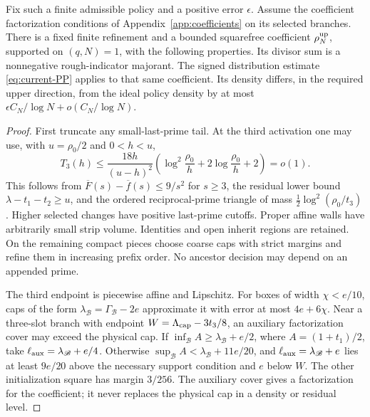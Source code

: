 \begin{proposition}\label{sv:finite-realization}
Fix such a finite admissible policy and a positive error $\epsilon$.
Assume the coefficient factorization conditions of
Appendix~\ref{app:coefficients} on its selected branches.
There is a fixed finite refinement and a bounded squarefree
coefficient $\rho_N^{\rm up}$, supported on $(q,N)=1$, with the following
properties.  Its divisor sum is a nonnegative rough-indicator
majorant.  The signed distribution estimate \eqref{eq:current-PP}
applies to that same coefficient.  Its density differs, in the
required upper direction, from the ideal policy density by at most
$\epsilon C_N/\log N+o(C_N/\log N)$.
\end{proposition}

\begin{proof}
First truncate any small-last-prime tail.  At the third activation
one may use, with $u=\rho_0/2$ and $0<h<u$,
\begin{equation}\label{sv:activation-tail}
 T_3(h)\le\frac{18h}{(u-h)^2}
   \left(\log^2\frac{\rho_0}{h}
                   +2\log\frac{\rho_0}{h}+2\right)=o(1).
\end{equation}
This follows from $\overline F(s)-\overline f(s)\le9/s^2$
for $s\ge3$, the residual lower bound $\lambda-t_1-t_2\ge u$,
and the ordered reciprocal-prime triangle of mass
$\tfrac12\log^2(\rho_0/t_3)$.  Higher selected changes have
positive last-prime cutoffs.  Proper affine walls have arbitrarily
small strip volume.  Identities and open inherit regions are
retained.  On the remaining compact pieces choose coarse caps with
strict margins and refine them in increasing prefix order.  No
ancestor decision may depend on an appended prime.

The third endpoint is piecewise affine and Lipschitz.  For boxes
of width $\chi<e/10$, caps of the form
$\lambda_{\mathscr B}=\Gamma_{\mathscr B}-2e$ approximate it with error at most
$4e+6\chi$.  Near a three-slot branch with endpoint
$W=\Lambda_{\rm cap}-3t_3/8$, an auxiliary factorization cover may exceed
the physical cap.  If $\inf_{\mathscr B} A\ge\lambda_{\mathscr B}+e/2$, where
$A=(1+t_1)/2$, take $\ell_{\rm aux}=\lambda_{\mathscr B}+e/4$.
Otherwise $\sup_{\mathscr B} A<\lambda_{\mathscr B}+11e/20$, and
$\ell_{\rm aux}=\lambda_{\mathscr B}+e$ lies at least $9e/20$ above the
necessary support condition and $e$ below $W$.  The other initialization square
has margin $3/256$.  The auxiliary cover gives a factorization for the coefficient;
it never replaces the physical cap in a density or residual level.


\end{proof}
